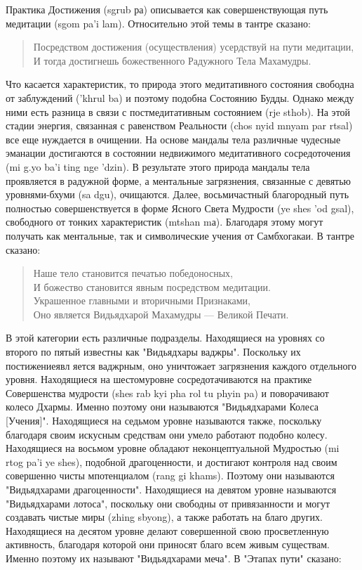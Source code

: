 Практика Достижения (sgrub ра) описывается как совершенствующая путь медитации
(sgom pa'i lam). Относительно этой темы в тантре сказано:

\begin{verse}
Посредством достижения (осуществления) усердствуй на пути медитации,\\
И тогда достигнешь божественного Радужного Тела Махамудры.
\end{verse}

Что касается характеристик, то природа этого медитативного состояния свободна от
заблуждений ('khrul ba) и поэтому подобна Состоянию Будды. Однако между ними есть
разница в связи с постмедитативным состоянием (rje sthob). На этой стадии энергия,
связанная с равенством Реальности (chos nyid mnyam par rtsal) все еще нуждается в
очищении. На основе мандалы тела различные чудесные эманации достигаются в состоянии
недвижимого медитативного сосредоточения (mi g.yo ba'i ting nge 'dzin). В результате этого
природа мандалы тела проявляется в радужной форме, а ментальные загрязнения, связанные
с девятью уровнями-бхуми (sa dgu), очищаются. Далее, восьмичастный благородный путь
полностью совершенствуется в форме Ясного Света Мудрости (ye shes 'od gsal), свободного
от тонких характеристик (mtshan mа). Благодаря этому могут получать как ментальные, так и
символические учения от Самбхогакаи. В тантре сказано:

\begin{verse}
Наше тело становится печатью победоносных,\\
И божество становится явным посредством медитации.\\
Украшенное главными и вторичными Признаками,\\
Оно является Видьядхарой Махамудры — Великой Печати.
\end{verse}

В этой категории есть различные подразделы. Находящиеся на уровнях со второго по
пятый известны как "Видьядхары ваджры". Поскольку их постижениеявл яется ваджрным,
оно уничтожает загрязнения каждого отдельного уровня. Находящиеся на шестомуровне
сосредотачиваются на практике Совершенства мудрости (shes rab kyi pha rol tu phyin pa) и
поворачивают колесо Дхармы. Именно поэтому они называются "Видьядхарами Колеса
[Учения]". Находящиеся на седьмом уровне называются также, поскольку благодаря своим
искусным средствам они умело работают подобно колесу. Находящиеся на восьмом уровне
обладают неконцептуальной Мудростью (mi rtog pa'i ye shes), подобной драгоценности, и
достигают контроля над своим совершенно чисты мпотенциалом (rang gi khams). Поэтому
они называются "Видьядхарами драгоценности". Находящиеся на девятом уровне
называются "Видьядхарами лотоса", поскольку они свободны от привязанности и могут
создавать чистые миры (zhing sbyong), а также работать на благо других. Находящиеся на
десятом уровне делают совершенной свою просветленную активность, благодаря которой
они приносят благо всем живым существам. Именно поэтому их называют "Видьядхарами
меча". В "Этапах пути" сказано:

